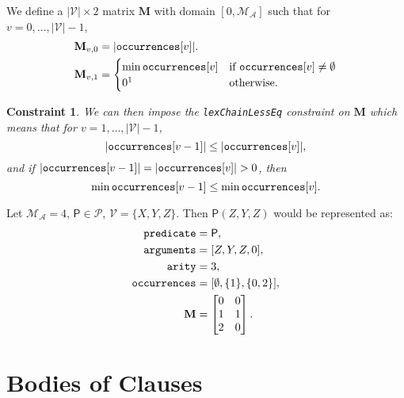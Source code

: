 \documentclass[runningheads]{llncs}
\newtheorem{constraint}{Constraint}
\newcommand{\variable}[1]{\texttt{\textup{#1}}}
\newcommand{\predicates}{\mathcal{P}}
\newcommand{\variables}{\mathcal{V}}
\newcommand{\maxArity}{\mathcal{M}_{\mathcal{A}}}
\begin{document}
\begin{definition}
  We define a $|\variables{}| \times 2$ matrix $\mathbf{M}$ with domain $[0,
  \maxArity{}]$ such that for $v = 0, \dots, |\variables{}| - 1$,
  \begin{align*}
    \mathbf{M}_{v,0} &= |\variable{occurrences}[v]|.\\
    \mathbf{M}_{v,1} &= \begin{cases}
      \min \variable{occurrences}[v] & \text{if } \variable{occurrences}[v] \ne \emptyset\\
      0\footnotemark & \text{otherwise.}
    \end{cases}
  \end{align*}
\end{definition}

\begin{constraint}
  We can then impose the \variable{lexChainLessEq} constraint on $\mathbf{M}$
  which means that for $v = 1, \dots, |\variables{}| - 1$,
  \[
    |\variable{occurrences}[v - 1]| \le |\variable{occurrences}[v]|,
  \]
  and if $|\variable{occurrences}[v - 1]| = |\variable{occurrences}[v]| > 0$,
  then
  \[
    \min \variable{occurrences}[v - 1] \le \min \variable{occurrences}[v].
  \]
\end{constraint}

\begin{example}
  Let $\maxArity{} = 4$, $\mathsf{P} \in \predicates{}$, $\variables{} = \{
  X, Y, Z \}$. Then $\mathsf{P}(Z, Y, Z)$ would be represented as:
  \begin{align*}
    \variable{predicate} &= \mathsf{P},\\
    \variable{arguments} &= [Z, Y, Z, 0],\\
    \variable{arity} &= 3,\\
    \variable{occurrences} &= [\emptyset, \{ 1 \}, \{ 0, 2 \}],\\
    \mathbf{M} &= \begin{bmatrix}
      0 & 0\\
      1 & 1\\
      2 & 0
    \end{bmatrix}.
  \end{align*}
\end{example}

\section{Bodies of Clauses}
\end{document}
